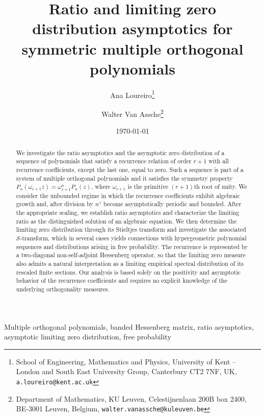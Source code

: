 \documentclass[12pt]{article}
\title{Ratio and limiting zero distribution asymptotics for symmetric multiple orthogonal polynomials}
\author{Ana Loureiro\footnote{School of Engineering, Mathematics and Physics, University of Kent -- London and South East University Group, Canterbury
CT2 7NF, UK, \texttt{a.loureiro@kent.ac.uk}} \and Walter Van Assche\footnote{Department of Mathematics, KU Leuven, Celestijnenlaan 200B box 2400, BE-3001 Leuven, Belgium, \texttt{walter.vanassche@kuleuven.be}}}
\date{\today}
\newcommand{\St}{\mathcal{S}} %
\numberwithin{equation}{section}
\begin{document}
\maketitle 



\begin{abstract}
We investigate the ratio asymptotics and the asymptotic zero distribution of a sequence of polynomials that satisfy a recurrence relation of order $r+1$ with all recurrence coefficients, except the last one, equal to zero. Such a sequence is part of a system of multiple orthogonal polynomials and  it satisfies the symmetry property $P_n(\omega_{r+1} z) = \omega_{r+1}^n P_n(z)$, where $\omega_{r+1}$ is the
primitive $(r+1)$th root of unity.  
We consider the unbounded regime in which the recurrence coefficients exhibit algebraic growth and, after division by $n^{\gamma}$ become asymptotically periodic and bounded.
After the appropriate scaling, we establish ratio asymptotics and characterize the limiting ratio as the distinguished solution of an algebraic equation. We then determine the limiting zero distribution through its Stieltjes transform and investigate the associated \(\St\)-transform, which in several cases yields connections with hypergeometric polynomial sequences and distributions arising in free probability. The recurrence is represented by a two-diagonal non-self-adjoint Hessenberg operator, so that the limiting zero measure also admits a natural interpretation as a limiting empirical spectral distribution of its rescaled finite sections. Our analysis is based solely on the positivity and asymptotic behavior of the recurrence coefficients and requires no explicit knowledge of the underlying orthogonality measures.
\end{abstract}

 Multiple orthogonal polynomials, banded Hessenberg matrix, ratio asymptotics, asymptotic limiting zero distribution, free probability

\tableofcontents

 
\end{document}
